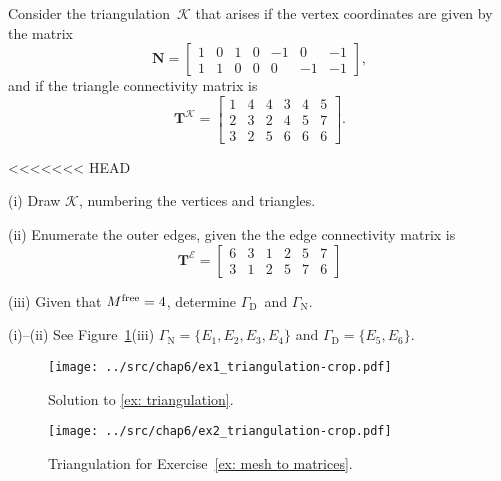 \begin{Exercises}
\exercise\label{ex: triangulation}
Consider the triangulation~$\mathcal{K}$ that arises if the vertex coordinates 
are given by the matrix
\[
\boldsymbol{N}=\begin{bmatrix}
1&0&1&0&-1& 0&-1\\
1&1&0&0& 0&-1&-1\end{bmatrix},
\]
and if the triangle connectivity matrix is
\[
\boldsymbol{T}^{\mathcal{K}}=\begin{bmatrix}
1&4&4&3&4&5\\
2&3&2&4&5&7\\
3&2&5&6&6&6\end{bmatrix}.
\]
\begin{description}
<<<<<<< HEAD
\item{(i)} Draw $\mathcal{K}$, numbering the vertices and triangles.
\item{(ii)} Enumerate the outer edges, given the the edge connectivity matrix is
\[
\boldsymbol{T}^{\mathcal{E}}=\begin{bmatrix}
6&3&1&2&5&7\\
3&1&2&5&7&6\end{bmatrix}
\]
\item{(iii)} Given that $M^{\mathrm{free}}=4$, determine $\Gamma_{\mathrm{D}}$~and
$\Gamma_{\mathrm{N}}$.
\end{description}
\begin{ans}
(i)--(ii) See Figure~\ref{fig: triangulation solution}\quad(iii) 
$\Gamma_{\mathrm{N}}=\{E_1,E_2,E_3,E_4\}$ and
$\Gamma_{\mathrm{D}}=\{E_5,E_6\}$.
\begin{figure}
\caption{Solution to \ref{ex: triangulation}.}
\label{fig: triangulation solution}
\begin{center}
\texttt{[image: ../src/chap6/ex1\_triangulation-crop.pdf]}
\end{center}
\end{figure}
\end{ans}

\begin{figure}
\caption{Triangulation for Exercise~\ref{ex: mesh to matrices}.}
\label{fig: mesh to matrices}
\begin{center}
\texttt{[image: ../src/chap6/ex2\_triangulation-crop.pdf]}
\end{center}
\end{figure}


\end{Exercises}
